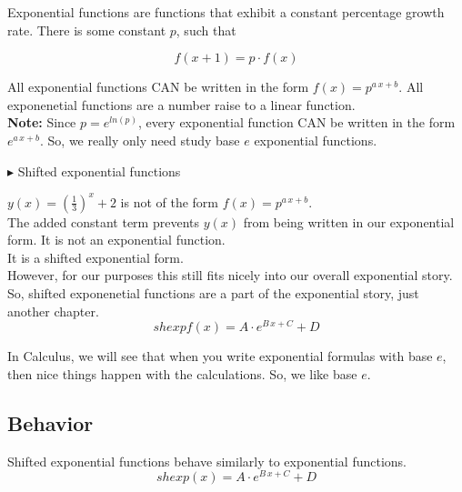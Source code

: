 \documentclass{ximera}
\begin{document}
\begin{warning}

Exponential functions are functions that exhibit a constant percentage growth rate.  There is some constant $p$, such that

\[
f(x+1) = p \cdot f(x)
\]


All exponential functions CAN be written in the form $f(x) = p^{a \, x + b}$.  All exponenetial functions are a number raise to a linear function.  \\


\textbf{Note:} Since $p = e^{ln(p)}$, every exponential function CAN be written in the form $e^{a \, x + b}$.  So, we really only need study base $e$ exponential functions.


$\blacktriangleright$ Shifted exponential functions


$y(x) = \left(\frac{1}{3}\right)^x + 2$ is not of the form $f(x) = p^{a \, x + b}$. \\  


The added constant term prevents $y(x)$ from being written in our exponential form.  It is not an exponential function. \\

It is a shifted exponential form. \\


However, for our purposes this still fits nicely into our overall exponential story.  So, shifted exponenetial functions are a part of the exponential story, just another chapter. \\

\[
shexpf(x) = A \cdot e^{B \, x + C} + D
\]



\end{warning}



In Calculus, we will see that when you write exponential formulas with base $e$, then nice things happen with the calculations.  So, we like base $e$. \\




\subsection*{Behavior}


Shifted exponential functions behave similarly to exponential functions. \\

\[
shexp(x) = A \cdot e^{B \, x + C} + D
\]
\end{document}
